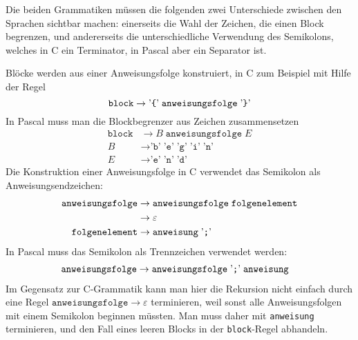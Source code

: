 \begin{loesung}
Die beiden Grammatiken müssen die folgenden zwei Unterschiede zwischen
den Sprachen sichtbar machen: einerseits die Wahl der Zeichen,
die einen Block begrenzen, und andererseits die unterschiedliche
Verwendung des Semikolons, welches
in C ein Terminator, in Pascal aber ein Separator ist.

Blöcke werden aus einer Anweisungsfolge konstruiert, in C zum Beispiel
mit Hilfe der Regel
\[
\texttt{block}
\rightarrow
\text{'{\tt \{}'}\;\texttt{anweisungsfolge}\; \text{'{\tt\}}'}
\]
In Pascal muss man die Blockbegrenzer aus Zeichen zusammensetzen
\begin{align*}
\texttt{block}
&\rightarrow
B\; \texttt{anweisungsfolge}\;E
\\
B&\rightarrow
\text{'}\texttt{b}\text{'}\;
\text{'}\texttt{e}\text{'}\;
\text{'}\texttt{g}\text{'}\;
\text{'}\texttt{i}\text{'}\;
\text{'}\texttt{n}\text{'}
\\
E&\rightarrow
\text{'}\texttt{e}\text{'}\;
\text{'}\texttt{n}\text{'}\;
\text{'}\texttt{d}\text{'}
\end{align*}
Die Konstruktion einer Anweisungsfolge in C verwendet das Semikolon als
Anweisungsendzeichen:
\begin{align*}
\texttt{anweisungsfolge}
&\rightarrow
\texttt{anweisungsfolge}
\;
\texttt{folgenelement}
\\
&\rightarrow\varepsilon
\\
\texttt{folgenelement}
&\rightarrow 
\texttt{anweisung}
\;\text{'{\tt ;}'}
\end{align*}
In Pascal muss das Semikolon als Trennzeichen verwendet werden:
\begin{align*}
\texttt{anweisungsfolge}
&\rightarrow
\texttt{anweisungsfolge} \; \text{'{\tt ;}'}\; \texttt{anweisung}
\end{align*}
Im Gegensatz zur C-Grammatik kann man hier die Rekursion nicht einfach
durch eine Regel $\texttt{anweisungsfolge}\to \varepsilon$ terminieren,
weil sonst alle Anweisungsfolgen mit einem Semikolon beginnen müssten.
Man muss daher mit \texttt{anweisung} terminieren, und den Fall eines
leeren Blocks in der \texttt{block}-Regel abhandeln.


\end{loesung}
